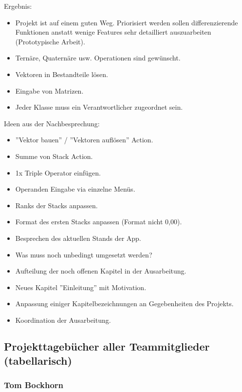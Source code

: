 Ergebnis:

\begin{itemize}
	\item Projekt ist auf einem guten Weg. Priorisiert werden sollen differenzierende Funktionen anstatt wenige Features sehr detailliert auszuarbeiten (Prototypische Arbeit).
	\item Ternäre, Quaternäre usw. Operationen sind gewünscht.
	\item Vektoren in Bestandteile lösen.
	\item Eingabe von Matrizen.
	\item Jeder Klasse muss ein Verantwortlicher zugeordnet sein.
\end{itemize}

Ideen aus der Nachbesprechung:

\begin{itemize}
	\item ''Vektor bauen'' / ''Vektoren auflösen'' Action. 
	\item Summe von Stack Action.
	\item 1x Triple Operator einfügen.
	\item Operanden Eingabe via einzelne Menüs.
	\item Ranks der Stacks anpassen.
	\item Format des ersten Stacks anpassen (Format nicht 0,00).
\end{itemize}


\begin{itemize}
	\item Besprechen des aktuellen Stands der App.
	\item Was muss noch unbedingt umgesetzt werden?
	\item Aufteilung der noch offenen Kapitel in der Ausarbeitung.
	\item Neues Kapitel ''Einleitung'' mit Motivation.
	\item Anpassung einiger Kapitelbezeichnungen an Gegebenheiten des Projekts.
	\item Koordination der Ausarbeitung.
\end{itemize}

\subsection{Projekttagebücher aller Teammitglieder (tabellarisch)}

\subsubsection{Tom Bockhorn}

